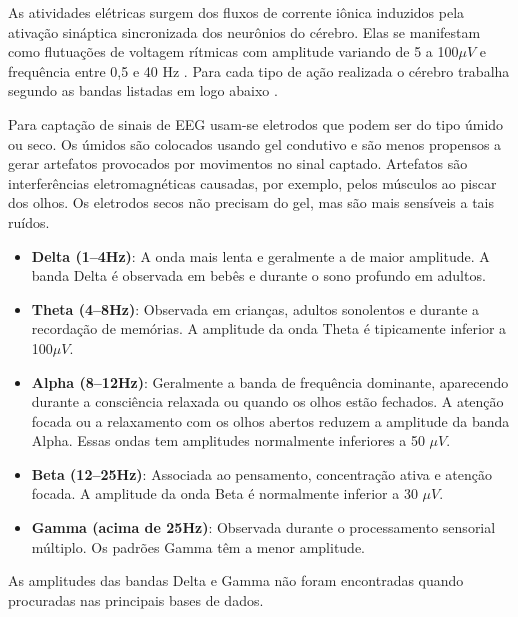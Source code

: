 			\par As atividades elétricas surgem dos fluxos de corrente iônica induzidos pela ativação sináptica sincronizada dos neurônios do cérebro. Elas se manifestam como flutuações de voltagem rítmicas com amplitude variando de 5 a 100$\mu V$ e frequência entre 0,5 e 40 Hz \cite{JALALYBIDGOLY2020101788}. Para cada tipo de ação realizada o cérebro trabalha segundo as bandas listadas em logo abaixo \cite{sanei2021eeg}.
			
			\par Para captação de sinais de EEG usam-se eletrodos que podem ser do tipo úmido ou seco. Os úmidos são colocados usando gel condutivo e são menos propensos a gerar artefatos provocados por movimentos no sinal captado. Artefatos são interferências eletromagnéticas causadas, por exemplo, pelos músculos ao piscar dos olhos. Os eletrodos secos não precisam do gel, mas são mais sensíveis a tais ruídos.
			
			\begin{itemize}
				\item \textbf{Delta (1–4Hz)}: A onda mais lenta e geralmente a de maior amplitude. A banda Delta é observada em bebês e durante o sono profundo em adultos.
				
				\item \textbf{Theta (4–8Hz)}: Observada em crianças, adultos sonolentos e durante a recordação de memórias. A amplitude da onda Theta é tipicamente inferior a 100$\mu V$.
				
				\item \textbf{Alpha (8–12Hz)}: Geralmente a banda de frequência dominante, aparecendo durante a consciência relaxada ou quando os olhos estão fechados. A atenção focada ou a relaxamento com os olhos abertos reduzem a amplitude da banda Alpha. Essas ondas tem amplitudes normalmente inferiores a 50 $\mu V$.
				
				\item \textbf{Beta (12–25Hz)}: Associada ao pensamento, concentração ativa e atenção focada. A amplitude da onda Beta é normalmente inferior a 30 $\mu V$.
				
				\item \textbf{Gamma (acima de 25Hz)}: Observada durante o processamento sensorial múltiplo. Os padrões Gamma têm a menor amplitude.
				
			\end{itemize}
			
			\par As amplitudes das bandas Delta e Gamma não foram encontradas quando procuradas nas principais bases de dados.
			
